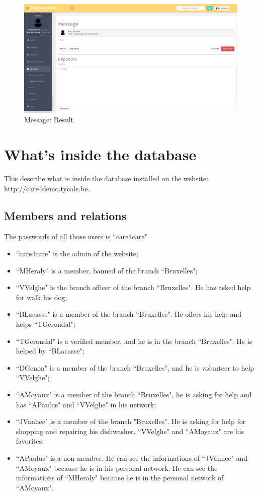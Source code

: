 \documentclass{article}
\begin{document}
\begin{figure}[!ht]
   \includegraphics[width=\textwidth]{img/mess4.png}
   \caption{Message: Result}
\end{figure}
\section{What's inside the database}
This describe what is inside the database installed on the website: http://care4demo.tycale.be.
\subsection{Members and relations}
The passwords of all those users is ``care4care"
\begin{itemize}
	\item ``care4care" is the admin of the website;
	\item ``MHeraly" is a member, banned of the branch ``Bruxelles";
	\item ``VVelghe" is the branch officer of the branch ``Bruxelles". He has asked help for walk his dog;
	\item ``BLacasse" is a member of the branch ``Bruxelles". He offers his help and helps ``TGerondal";
	\item ``TGerondal" is a verified member, and he is in the branch ``Bruxelles". He is helped by ``BLacasse";
	\item ``DGenon" is a member of the branch ``Bruxelles", and he is volunteer to help ``VVelghe";
	\item ``AMoyaux" is a member of the branch ``Bruxelles", he is asking for help and has ``APaulus" and ``VVelghe" in his network;
	\item ``JVanhee" is a member of the branch "Bruxelles". He is asking for help for shopping and repairing his dishwasher.  ``VVelghe" and ``AMoyaux" are his favorites;
	\item ``APaulus" is a non-member. He can see the informations of ``JVanhee" and ``AMoyaux" because he is in his personal network. He can see the informations of ``MHeraly" because he is in the personal network of ``AMoyaux".
\end{itemize}
\end{document}
